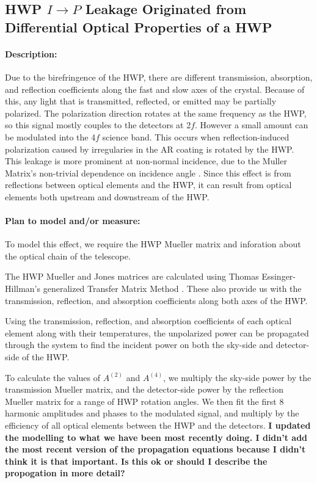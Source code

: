 
\subsection{HWP $I \rightarrow P$ Leakage Originated from Differential Optical Properties of a HWP}
\label{HWP Differential Optical Properties}

\paragraph{Description:}
Due to the birefringence of the HWP, there are different transmission, absorption, and reflection coefficients along the fast and slow axes of the crystal. Because of this, any light that is transmitted, reflected, or emitted may be partially polarized. The polarization direction rotates at the same frequency as the HWP, so this signal mostly couples to the detectors at 2$f$.
However a small amount can be modulated into the 4$f$ science band. This occurs when reflection-induced polarization caused by irregularies in the AR coating is rotated by the HWP. This leakage is more prominent at non-normal incidence, due to the Muller Matrix's non-trivial dependence on incidence angle \cite{Essinger-Hileman2013, Essinger-Hileman2016, ABS_HWP}.  Since this effect is from reflections between optical elements and the HWP, it can result from optical elements both upstream and downstream of the HWP.

\paragraph{Plan to model and/or measure:}
To model this effect, we require the HWP Mueller matrix and inforation about the optical chain of the telescope.

The HWP Mueller and Jones matrices are calculated using Thomas Essinger-Hillman's generalized Transfer Matrix Method \cite{Essinger-Hileman2013}.
These also provide us with the transmission, reflection, and absorption coefficients along both axes of the HWP.

Using the transmission, reflection, and absorption coefficients of each optical element along with their temperatures, the unpolarized power can be propagated through the system to find the incident power on both the sky-side and detector-side of the HWP.

To calculate the values of $A^{(2)}$ and $A^{(4)}$, we multiply the sky-side power by the transmission Mueller matrix, and the detector-side power by the reflection Mueller matrix for a range of HWP rotation angles. 
We then fit the first 8 harmonic amplitudes and phases to the modulated signal, and multiply by the efficiency of all optical elements between the HWP and the detectors. 
\textbf{I updated the modelling to what we have been most recently doing. I didn't add the most recent version of the propagation equations because I didn't think it is that important. Is this ok or should I describe the propogation in more detail? } 

